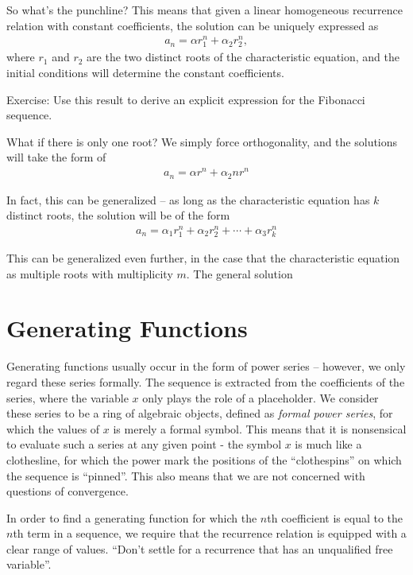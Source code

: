 \documentclass[a4paper,10pt]{report}
\begin{document}
	So what's the punchline? This means that given a linear homogeneous recurrence relation with constant coefficients, the solution can be uniquely expressed as
	\begin{gather}
		a_n = \alpha r_1^n + \alpha_2 r_2^n,
	\end{gather}
	where $r_1$ and $r_2$ are the two distinct roots of the characteristic equation, and the initial conditions will determine the constant coefficients.

	Exercise: Use this result to derive an explicit expression for the Fibonacci sequence.

	What if there is only one root? We simply force orthogonality, and the solutions will take the form of
	\begin{gather}
		a_n = \alpha r^n + \alpha_2 nr^n
	\end{gather}

	In fact, this can be generalized -- as long as the characteristic equation has $k$ distinct roots, the solution will be of the form
	\begin{gather}
		a_n = \alpha_1 r_1^n + \alpha_2 r_2^n + \cdots + \alpha_3 r_k^n
	\end{gather}

	This can be generalized even further, in the case that the characteristic equation as multiple roots with multiplicity $m$. The general solution

\section{Generating Functions}
Generating functions usually occur in the form of power series -- however, we only regard these series formally. The sequence is extracted from the coefficients of the series, where the variable $x$ only plays the role of a placeholder. We consider these series to be a ring of algebraic objects, defined as \textit{formal power series}, for which the values of $x$ is merely a formal symbol. This means that it is nonsensical to evaluate such a series at any given point - the symbol $x$ is much like a clothesline, for which the power mark the positions of the ``clothespins'' on which the sequence is ``pinned''. This also means that we are not concerned with questions of convergence.

In order to find a generating function for which the $n$th coefficient is equal to the $n$th term in a sequence, we require that the recurrence relation is equipped with a clear range of values. ``Don't settle for a recurrence that has an unqualified free variable''.
\end{document}
